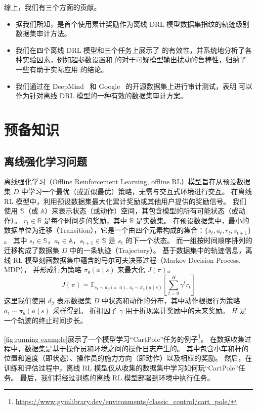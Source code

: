 综上，我们有三个方面的贡献。
\begin{itemize}
    \item 据我们所知，\sysnameo 是首个使用累计奖励作为离线 DRL 模型数据集指纹的轨迹级别数据集审计方法。
    \item 我们在四个离线 DRL 模型和三个任务上展示了 \sysnameo 的有效性，并系统地分析了各种实验因素，例如超参数设置和 \sysnameo 的对于可疑模型输出扰动的鲁棒性，归纳了一些有助于实际应用 \sysnameo 的结论。
    \item 我们通过在 DeepMind~\cite{DBLP:conf/nips/Gulcehre0NPCZAM20} 和 Google~\cite{DBLP:conf/nips/Pomerleau88} 的开源数据集上进行审计测试，表明 \sysnameo 可以作为针对离线 DRL 模型的一种有效的数据集审计方案。
\end{itemize}

\section{预备知识}
\label{sec:background}
\subsection{离线强化学习问题}
\label{sec:Offline Reinforcement Learning Problem}
离线强化学习（Offline Reinforcement Learning, offline RL）模型旨在从预设数据集 $D$ 中学习一个最优（或近似最优）策略，无需与交互式环境进行交互。
在离线 RL 模型中，利用预设数据集最大化累计奖励或其他用户提供的奖励信号。
我们使用 $\mathbb{S}$（或 $\mathbb{A}$）来表示状态（或动作）空间，其包含模型的所有可能状态（或动作）。
$r_t \in \mathbb{R}$ 是每个时间步的奖励，其中 $\mathbb{R}$ 是实数集。
在预设数据集中，最小的数据单位为迁移（Transition），它是一个由四个元素构成的集合：$\{s_t, a_t, r_t, s_{t+1}\}$。
其中 $s_t \in \mathbb{S}$，$a_t \in \mathbb{A}$，$s_{t+1} \in \mathbb{S}$ 是 $s_t$ 的下一个状态。
而一组按时间顺序排列的迁移构成了数据集 $D$ 中的一条轨迹（Trajectory）。
基于数据集中的轨迹信息，离线 RL 模型刻画数据集中蕴含的马尔可夫决策过程（Markov Decision Process, MDP），
并形成行为策略 $\pi_\theta(a\mid{s})$ 来最大化 $J(\pi)$。
\begin{equation}
    J(\pi)=\mathbb{E}_{{s_t} \sim d_{\beta}({s,~a}),~{a_t} \sim \pi_\theta({a} \mid {s})}\left[\sum_{t=0}^{{H}} \gamma^{t} r_t\right]
\end{equation}
这里我们使用 $d_{\beta}$ 表示数据集 $D$ 中状态和动作的分布，其中动作根据行为策略 ${a_t}\sim \pi_\theta(a\mid{s})$ 采样得到。
折扣因子 $\gamma$ 用于折现累计奖励中的未来奖励。
$H$ 是一个轨迹的终止时间步长。

\autoref{fig:running example}展示了一个模型学习“CartPole”任务的例子\footnote{\url{https://www.gymlibrary.dev/environments/classic_control/cart_pole/}}。
在数据收集过程中，数据集是基于操作员和环境之间的操作日志产生的。
其中包含小车和杆的位置和速度（即状态）、操作员的施力方向（即动作）以及相应的奖励。
然后，在训练和评估过程中，离线 RL 模型仅从收集的数据集中学习如何玩“CartPole”任务。
最后，我们将经过训练的离线 RL 模型部署到环境中执行任务。

